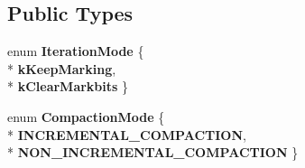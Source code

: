 \subsection*{Public Types}
\begin{DoxyCompactItemize}
\item 
enum {\bfseries Iteration\+Mode} \{ \\*
{\bfseries k\+Keep\+Marking}, 
\\*
{\bfseries k\+Clear\+Markbits}
 \}\hypertarget{classv8_1_1internal_1_1_mark_compact_collector_a73ad07045ed00233f92402a577f5361e}{}\label{classv8_1_1internal_1_1_mark_compact_collector_a73ad07045ed00233f92402a577f5361e}

\item 
enum {\bfseries Compaction\+Mode} \{ \\*
{\bfseries I\+N\+C\+R\+E\+M\+E\+N\+T\+A\+L\+\_\+\+C\+O\+M\+P\+A\+C\+T\+I\+ON}, 
\\*
{\bfseries N\+O\+N\+\_\+\+I\+N\+C\+R\+E\+M\+E\+N\+T\+A\+L\+\_\+\+C\+O\+M\+P\+A\+C\+T\+I\+ON}
 \}\hypertarget{classv8_1_1internal_1_1_mark_compact_collector_a7a79738350a55626346c35c63f5a135a}{}\label{classv8_1_1internal_1_1_mark_compact_collector_a7a79738350a55626346c35c63f5a135a}

\end{DoxyCompactItemize}
